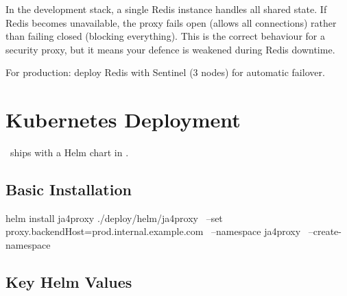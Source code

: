 \begin{warningbox}
In the development stack, a single Redis instance handles all shared state.
If Redis becomes unavailable, the proxy fails open (allows all connections)
rather than failing closed (blocking everything). This is the correct behaviour
for a security proxy, but it means your defence is weakened during Redis downtime.

For production: deploy Redis with Sentinel (3 nodes) for automatic failover.
\end{warningbox}

\section{Kubernetes Deployment}

\ja\ ships with a Helm chart in .

\subsection{Basic Installation}

\begin{bashcode}
helm install ja4proxy ./deploy/helm/ja4proxy \
  --set proxy.backendHost=prod.internal.example.com \
  --namespace ja4proxy \
  --create-namespace
\end{bashcode}

\subsection{Key Helm Values}

